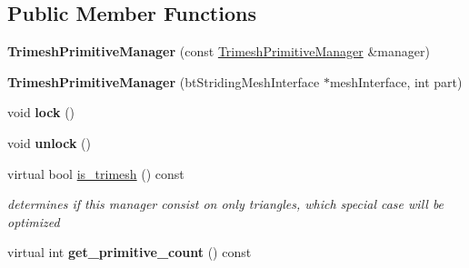 \subsection*{Public Member Functions}
\begin{DoxyCompactItemize}
\item 
\hypertarget{classbt_g_impact_mesh_shape_part_1_1_trimesh_primitive_manager_ac2132d17cd0eaab2deee81783492ea34}{{\bfseries Trimesh\+Primitive\+Manager} (const \hyperlink{classbt_g_impact_mesh_shape_part_1_1_trimesh_primitive_manager}{Trimesh\+Primitive\+Manager} \&manager)}\label{classbt_g_impact_mesh_shape_part_1_1_trimesh_primitive_manager_ac2132d17cd0eaab2deee81783492ea34}

\item 
\hypertarget{classbt_g_impact_mesh_shape_part_1_1_trimesh_primitive_manager_a2e8cb2bb12d4a52d99f10afbb2a5c06f}{{\bfseries Trimesh\+Primitive\+Manager} (bt\+Striding\+Mesh\+Interface $\ast$mesh\+Interface, int part)}\label{classbt_g_impact_mesh_shape_part_1_1_trimesh_primitive_manager_a2e8cb2bb12d4a52d99f10afbb2a5c06f}

\item 
\hypertarget{classbt_g_impact_mesh_shape_part_1_1_trimesh_primitive_manager_a48a013e72b76f832638a54326a7cc709}{void {\bfseries lock} ()}\label{classbt_g_impact_mesh_shape_part_1_1_trimesh_primitive_manager_a48a013e72b76f832638a54326a7cc709}

\item 
\hypertarget{classbt_g_impact_mesh_shape_part_1_1_trimesh_primitive_manager_aaa44d0463dfc7e66e203ede074db17ed}{void {\bfseries unlock} ()}\label{classbt_g_impact_mesh_shape_part_1_1_trimesh_primitive_manager_aaa44d0463dfc7e66e203ede074db17ed}

\item 
\hypertarget{classbt_g_impact_mesh_shape_part_1_1_trimesh_primitive_manager_aada8f4a60842983518401d05c94d1336}{virtual bool \hyperlink{classbt_g_impact_mesh_shape_part_1_1_trimesh_primitive_manager_aada8f4a60842983518401d05c94d1336}{is\+\_\+trimesh} () const }\label{classbt_g_impact_mesh_shape_part_1_1_trimesh_primitive_manager_aada8f4a60842983518401d05c94d1336}

\begin{DoxyCompactList}\small\item\em determines if this manager consist on only triangles, which special case will be optimized \end{DoxyCompactList}\item 
\hypertarget{classbt_g_impact_mesh_shape_part_1_1_trimesh_primitive_manager_aa22ce47d41fb78f28694a17b437335a0}{virtual int {\bfseries get\+\_\+primitive\+\_\+count} () const }\label{classbt_g_impact_mesh_shape_part_1_1_trimesh_primitive_manager_aa22ce47d41fb78f28694a17b437335a0}


\end{DoxyCompactItemize}
